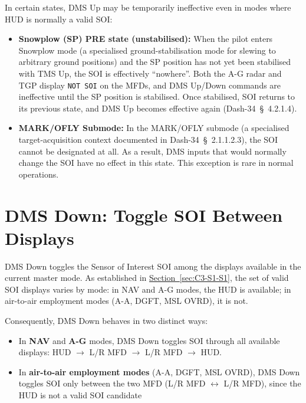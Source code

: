\documentclass[11pt, a4paper, twoside]{report}
\newcommand{\dashref}[1]{Dash-34~\S~#1}
\newcommand{\secref}[1]{\hyperref[#1]{Section~\ref*{#1}}}
\begin{document}
In certain states, DMS Up may be temporarily ineffective even in modes where HUD is normally a valid SOI:

\begin{itemize}
	\item \textbf{Snowplow (SP) PRE state (unstabilised):} When the pilot enters Snowplow mode (a specialised ground-stabilisation mode for slewing to arbitrary ground positions) and the SP position has not yet been stabilised with TMS Up, the SOI is effectively ``nowhere''. Both the A-G radar and TGP display \texttt{NOT SOI} on the MFDs, and DMS Up/Down commands are ineffective until the SP position is stabilised. Once stabilised, SOI returns to its previous state, and DMS Up becomes effective again (\dashref{4.2.1.4}).
	\item \textbf{MARK/OFLY Submode:} In the MARK/OFLY submode (a specialised target-acquisition context documented in \dashref{2.1.1.2.3}), the SOI cannot be designated at all. As a result, DMS inputs that would normally change the SOI have no effect in this state. This exception is rare in normal operations.
\end{itemize}

\section{DMS Down: Toggle SOI Between Displays}
\label{sec:C3-S3}

DMS Down toggles the Sensor of Interest SOI among the displays available in the current master mode. As established in \secref{sec:C3-S1-S1}, the set of valid SOI displays varies by mode: in NAV and A-G modes, the HUD is available; in air-to-air employment modes (A-A, DGFT, MSL OVRD), it is not.

Consequently, DMS Down behaves in two distinct ways:

\begin{itemize}
	\item In \textbf{NAV} and \textbf{A-G} modes, DMS Down toggles SOI through all available displays: HUD $\rightarrow$ L/R MFD $\rightarrow$ L/R MFD $\rightarrow$ HUD.
	\item In \textbf{air-to-air employment modes} (A-A, DGFT, MSL OVRD), DMS Down toggles SOI only between the two MFD (L/R MFD $\leftrightarrow$ L/R MFD), since the HUD is not a valid SOI candidate
\end{itemize}
\end{document}
